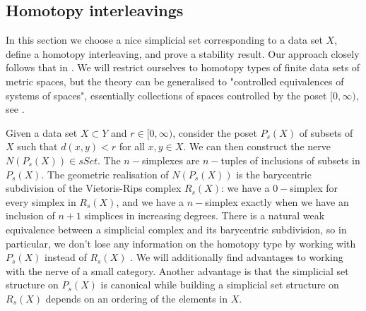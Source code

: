 \subsection{Homotopy interleavings}
In this section we choose a nice simplicial set corresponding to a data set $X$, define a homotopy interleaving, and prove a stability result. Our approach closely follows that in \cite{Jardine}. We will restrict ourselves to homotopy types of finite data sets of metric spaces, but the theory can be generalised to "controlled equivalences of systems of spaces", essentially collections of spaces controlled by the poset $[0,\infty)$, see \cite{Jardine}.

Given a data set $X\subset Y$ and $r\in [0,\infty)$, consider the poset $P_s(X)$ of subsets of $X$ such that $d(x,y)<r$ for all $x,y\in X$. We can then construct the nerve $N(P_s(X))\in sSet$. The $n-$simplexes are $n-$tuples of inclusions of subsets in $P_s(X)$. The geometric realisation of $N(P_s(X))$ is the barycentric subdivision of the Vietoris-Rips complex $R_s(X)$: we have a $0-$simplex for every simplex in $R_s(X)$, and we have a $n-$simplex exactly when we have an inclusion of $n+1$ simplices in increasing degrees. There is a natural weak equivalence between a simplicial complex and its barycentric subdivision, so in particular, we don't lose any information on the homotopy type by working with $P_s(X)$ instead of $R_s(X)$ \cite{Goerss2009}. We will additionally find advantages to working with the nerve of a small category. Another advantage is that the simplicial set structure on $P_s(X)$ is canonical while building a simplicial set structure on $R_s(X)$ depends on an ordering of the elements in $X$.


